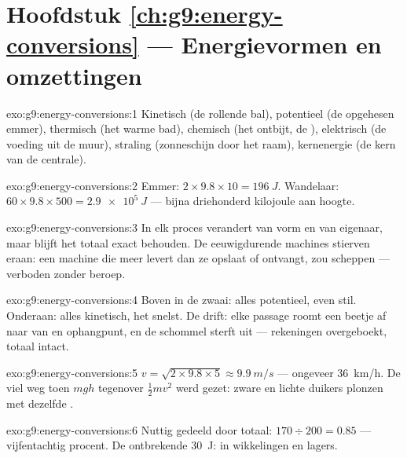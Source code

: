 \section*{Hoofdstuk \ref{ch:g9:energy-conversions} --- Energievormen en omzettingen}

\begin{solution}{exo:g9:energy-conversions:1}
Kinetisch (de rollende bal), potentieel (de opgehesen emmer),
thermisch (het warme bad), chemisch (het ontbijt, de
), elektrisch (de voeding uit de muur), straling
(zonneschijn door het raam), kernenergie (de kern van de centrale).
\end{solution}

\begin{solution}{exo:g9:energy-conversions:2}
Emmer: $2 \times 9.8 \times 10 = \qty{196}{J}$. Wandelaar: $60 \times
9.8 \times 500 = \qty{2.9e5}{J}$ --- bijna driehonderd kilojoule aan
hoogte.
\end{solution}

\begin{solution}{exo:g9:energy-conversions:3}
In elk proces verandert  van vorm en van eigenaar, maar
blijft het totaal exact behouden. De eeuwigdurende machines stierven
eraan: een machine die meer levert dan ze opslaat of ontvangt, zou
 scheppen --- verboden zonder beroep.
\end{solution}

\begin{solution}{exo:g9:energy-conversions:4}
Boven in de zwaai: alles potentieel, even stil. Onderaan: alles
kinetisch, het snelst. De drift: elke passage roomt een beetje af naar
 van  en ophangpunt, en de schommel sterft
uit --- rekeningen overgeboekt, totaal intact.
\end{solution}

\begin{solution}{exo:g9:energy-conversions:5}
$v = \sqrt{2 \times 9.8 \times 5} \approx \qty{9.9}{m/s}$ --- ongeveer
\qty{36}{km/h}. De  viel weg toen $m g h$ tegenover
$\frac12 m v^2$ werd gezet: zware en lichte duikers plonzen met
dezelfde .
\end{solution}

\begin{solution}{exo:g9:energy-conversions:6}
Nuttig gedeeld door totaal: $170 \div 200 = 0.85$ --- vijfentachtig
procent. De ontbrekende \qty{30}{J}:  in wikkelingen en lagers.
\end{solution}

